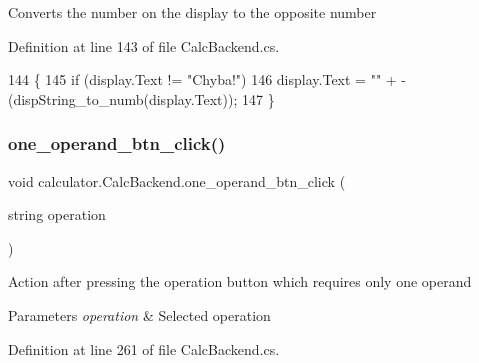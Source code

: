 Converts the number on the display to the opposite number 



Definition at line 143 of file Calc\+Backend.\+cs.


\begin{DoxyCode}
144         \{
145             \textcolor{keywordflow}{if} (display.Text != \textcolor{stringliteral}{"Chyba!"})
146                 display.Text = \textcolor{stringliteral}{""} + -(dispString\_to\_numb(display.Text));
147         \}
\end{DoxyCode}
\mbox{\label{classcalculator_1_1_calc_backend_a95eafd7b5831e854bc32cd2cd2fb16be}} 
\subsubsection{one\+\_\+operand\+\_\+btn\+\_\+click()}
{\footnotesize\ttfamily void calculator.\+Calc\+Backend.\+one\+\_\+operand\+\_\+btn\+\_\+click (\begin{DoxyParamCaption}\item[{string}]{operation }\end{DoxyParamCaption})}



Action after pressing the operation button which requires only one operand 


\begin{DoxyParams}{Parameters}
{\em operation} & Selected operation\\
\hline
\end{DoxyParams}


Definition at line 261 of file Calc\+Backend.\+cs.


